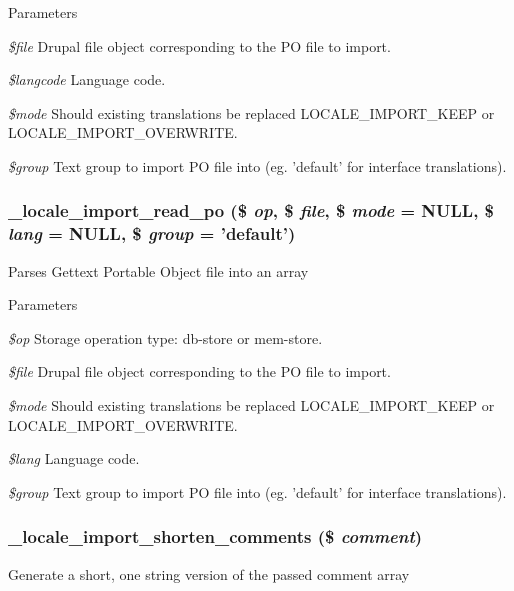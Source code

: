 \begin{DoxyParams}{Parameters}
\item[{\em \$file}]Drupal file object corresponding to the PO file to import. \item[{\em \$langcode}]Language code. \item[{\em \$mode}]Should existing translations be replaced LOCALE\_\-IMPORT\_\-KEEP or LOCALE\_\-IMPORT\_\-OVERWRITE. \item[{\em \$group}]Text group to import PO file into (eg. 'default' for interface translations). \end{DoxyParams}
\hypertarget{group__locale_ga97099fd0b115843fd4d443686a3ca35d}{
\subsubsection[{\_\-locale\_\-import\_\-read\_\-po}]{\setlength{\rightskip}{0pt plus 5cm}\_\-locale\_\-import\_\-read\_\-po (\$ {\em op}, \/  \$ {\em file}, \/  \$ {\em mode} = {\ttfamily NULL}, \/  \$ {\em lang} = {\ttfamily NULL}, \/  \$ {\em group} = {\ttfamily 'default'})}}
\label{group__locale_ga97099fd0b115843fd4d443686a3ca35d}
Parses Gettext Portable Object file into an array


\begin{DoxyParams}{Parameters}
\item[{\em \$op}]Storage operation type: db-\/store or mem-\/store. \item[{\em \$file}]Drupal file object corresponding to the PO file to import. \item[{\em \$mode}]Should existing translations be replaced LOCALE\_\-IMPORT\_\-KEEP or LOCALE\_\-IMPORT\_\-OVERWRITE. \item[{\em \$lang}]Language code. \item[{\em \$group}]Text group to import PO file into (eg. 'default' for interface translations). \end{DoxyParams}
\hypertarget{group__locale_ga1cba05a4c159b1ed844f18ba484cc8e7}{
\subsubsection[{\_\-locale\_\-import\_\-shorten\_\-comments}]{\setlength{\rightskip}{0pt plus 5cm}\_\-locale\_\-import\_\-shorten\_\-comments (\$ {\em comment})}}
\label{group__locale_ga1cba05a4c159b1ed844f18ba484cc8e7}
Generate a short, one string version of the passed comment array


